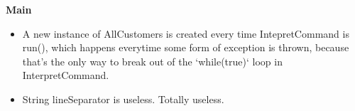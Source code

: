 \textbf{Main}
\begin{itemize}
	\item A new instance of AllCustomers is created every time IntepretCommand is run(), which happens everytime some form of exception is thrown, because that's the only way to break out of the `while(true)` loop in InterpretCommand. 
	\item String lineSeparator is useless. Totally useless.
\end{itemize}


